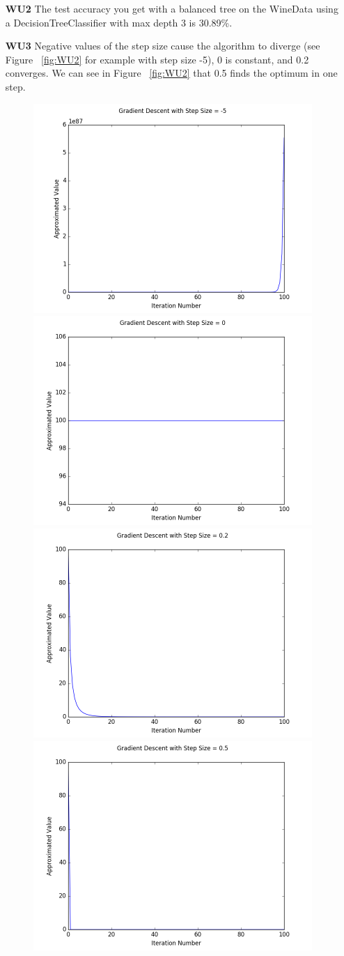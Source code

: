 \documentclass{article}
\begin{document}
\begin{enumerate}
	\item[\textbf{WU2}] The test accuracy you get with a balanced tree on the WineData using a DecisionTreeClassifier with max depth 3 is 30.89\%.
	
	\item[\textbf{WU3}] 
Negative values of the step size cause the algorithm to diverge (see Figure ~\ref{fig:WU2} for example with step size -5), 0 is constant, and 0.2 converges. We can see in Figure ~\ref{fig:WU2} that 0.5 finds the optimum in one step.
\pagebreak

\begin{figure}[htp]

\centering
\includegraphics[width=.5\textwidth]{gd_ss_neg5.png}\hfill
\includegraphics[width=.5\textwidth]{gd_ss_0.png}\hfill
\includegraphics[width=.5\textwidth]{gd_ss_point2.png}\hfill
\includegraphics[width=.5\textwidth]{gd_ss_point5.png}


\end{figure}
\end{enumerate}
\end{document}
